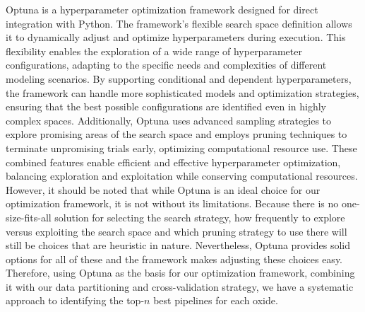 Optuna is a hyperparameter optimization framework designed for direct integration with Python.
The framework's flexible search space definition allows it to dynamically adjust and optimize hyperparameters during execution. 
This flexibility enables the exploration of a wide range of hyperparameter configurations, adapting to the specific needs and complexities of different modeling scenarios. 
By supporting conditional and dependent hyperparameters, the framework can handle more sophisticated models and optimization strategies, ensuring that the best possible configurations are identified even in highly complex spaces.
Additionally, Optuna uses advanced sampling strategies to explore promising areas of the search space and employs pruning techniques to terminate unpromising trials early, optimizing computational resource use. These combined features enable efficient and effective hyperparameter optimization, balancing exploration and exploitation while conserving computational resources. \cite{optuna_2019}
However, it should be noted that while Optuna is an ideal choice for our optimization framework, it is not without its limitations.
Because there is no one-size-fits-all solution for selecting the search strategy, how frequently to explore versus exploiting the search space and which pruning strategy to use there will still be choices that are heuristic in nature.
Nevertheless, Optuna provides solid options for all of these and the framework makes adjusting these choices easy.
Therefore, using Optuna as the basis for our optimization framework, combining it with our data partitioning and cross-validation strategy, we have a systematic approach to identifying the top-$n$ best pipelines for each oxide.

